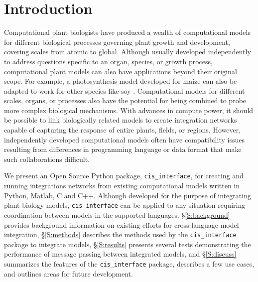 \documentclass[journal]{IEEEtran}
\newcommand{\todo}[1]{{\color{red}{#1}}}
\newcommand{\cis}{{\tt cis\_interface}{}}
\begin{document}
\section{Introduction}\label{S:intro}
%
Computational plant biologists have produced a wealth of computational models for different biological processes governing plant growth and development, covering scales from atomic to global. Although usually developed independently to address questions specific to an organ, species, or growth process, computational plant models can also have applications beyond their original scope. For example, a photosynthesis model developed for maize can also be adapted to work for other species like soy \todo{cite Kavya and Yu}. Computational models for different scales, organs, or processes also have the potential for being combined to probe more complex biological mechanisms. With advances in compute power, it should be possible to link biologically related models to create integration networks capable of capturing the response of entire plants, fields, or regions. However, independently developed computational models often have compatibility issues resulting from differences in programming language or data format that make such collaborations difficult. 

We present an Open Source Python package, {\cis}, for creating and running integrations networks from existing computational models written in Python, Matlab, C and C++. Although developed for the purpose of integrating plant biology models, {\cis} can be applied to any situation requiring coordination between models in the supported languages. \S\ref{S:background} provides background information on existing efforts for cross-language model integration, \S\ref{S:methods} describes the methods used by the {\cis} package to integrate models, \S\ref{S:results} presents several tests demonstrating the performance of message passing between integrated models, and \S\ref{S:discuss} summarizes the features of the {\cis} package, describes a few use cases, and outlines areas for future development.

\end{document}
